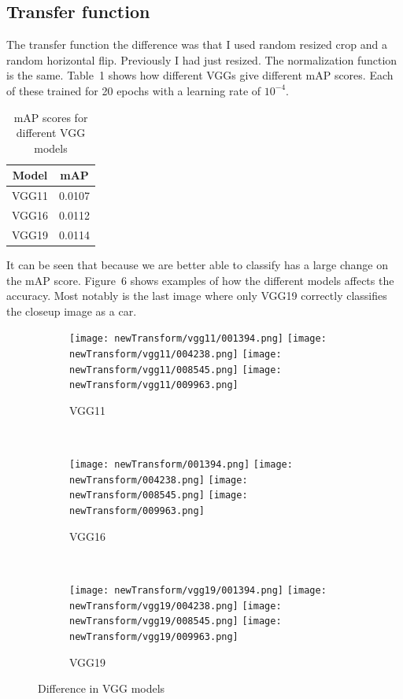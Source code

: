 \documentclass{article}
\begin{document}
\subsection{Transfer function}
The transfer function the difference was that I used random resized crop and a
random horizontal flip. Previously I had just resized. The normalization
function is the same. Table~1 shows how different VGGs give
different mAP scores. Each of these trained for 20 epochs with a learning rate
of $10^{-4}$.

\begin{table}
    \centering
\begin{tabular}{|c|c|}
    \hline
    Model & mAP\\
    \hline
    VGG11 & 0.0107\\
    \hline
    VGG16 & 0.0112\\
    \hline
    VGG19 & 0.0114\\
    \hline
\end{tabular}
    \caption{mAP scores for different VGG models}
\label{models}
\end{table}

It can be seen that because we are better able to classify has a large change on
the mAP score. Figure~6 shows examples of how the different
models affects the accuracy. Most notably is the last image where only VGG19
correctly classifies the closeup image as a car. 

\begin{figure}
    \centering
    \begin{subfigure}{\textwidth}
        \texttt{[image: newTransform/vgg11/001394.png]}
        \texttt{[image: newTransform/vgg11/004238.png]}
        \texttt{[image: newTransform/vgg11/008545.png]}
        \texttt{[image: newTransform/vgg11/009963.png]}
        \caption{VGG11}
        \label{fig:modela}
    \end{subfigure}
    \\
    \begin{subfigure}{\textwidth}
        \texttt{[image: newTransform/001394.png]}
        \texttt{[image: newTransform/004238.png]}
        \texttt{[image: newTransform/008545.png]}
        \texttt{[image: newTransform/009963.png]}
        \caption{VGG16}
        \label{fig:modelb}
    \end{subfigure}
    \\
    \begin{subfigure}{\textwidth}
        \texttt{[image: newTransform/vgg19/001394.png]}
        \texttt{[image: newTransform/vgg19/004238.png]}
        \texttt{[image: newTransform/vgg19/008545.png]}
        \texttt{[image: newTransform/vgg19/009963.png]}
        \caption{VGG19}
        \label{fig:modelc}
    \end{subfigure}
    \caption{Difference in VGG models}
    \label{fig:model}
\end{figure}
\end{document}
